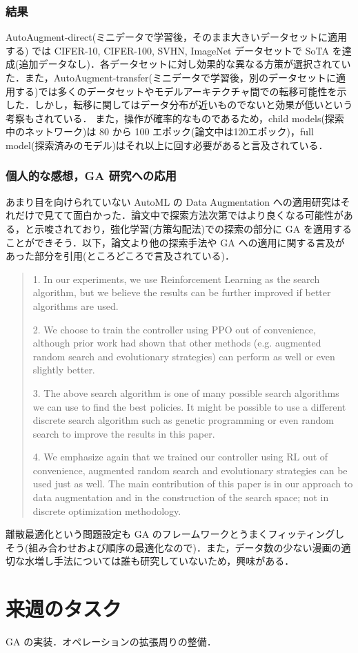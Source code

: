 \documentclass[onecolumn]{ujarticle}   %
\begin{document}
	\subsubsection{結果}
	AutoAugment-direct(ミニデータで学習後，そのまま大きいデータセットに適用する) では CIFER-10, CIFER-100, SVHN, ImageNet データセットで SoTA を達成(追加データなし)．各データセットに対し効果的な異なる方策が選択されていた．また，AutoAugment-transfer(ミニデータで学習後，別のデータセットに適用する)では多くのデータセットやモデルアーキテクチャ間での転移可能性を示した．しかし，転移に関してはデータ分布が近いものでないと効果が低いという考察もされている．
	また，操作が確率的なものであるため，child models(探索中のネットワーク)は 80 から 100 エポック(論文中は120エポック)，full model(探索済みのモデル)はそれ以上に回す必要があると言及されている．

	\subsubsection{個人的な感想，GA 研究への応用}
	あまり目を向けられていない AutoML の Data Augmentation への適用研究はそれだけで見てて面白かった．論文中で探索方法次第ではより良くなる可能性がある，と示唆されており，強化学習(方策勾配法)での探索の部分に GA を適用することができそう．以下，論文より他の探索手法や GA への適用に関する言及があった部分を引用(ところどころで言及されている)．

	\begin{quote}
		1. In our experiments, we use Reinforcement Learning as the search algorithm, but we believe the results can be further improved if better algorithms are used.

		2. We choose to train the controller using PPO out of convenience, although prior work had shown that other methods (e.g. augmented random search and evolutionary strategies) can perform as well or even slightly better.

		3. The above search algorithm is one of many possible search algorithms we can use to find the best policies. It might be possible to use a different discrete search algorithm such as genetic programming or even random search to improve the results in this paper.

		4. We emphasize again that we trained our controller using RL out of convenience, augmented random search and evolutionary strategies can be used just as well. The main contribution of this paper is in our approach to data augmentation and in the construction of the search space; not in discrete optimization methodology.
	\end{quote}

	離散最適化という問題設定も GA のフレームワークとうまくフィッティングしそう(組み合わせおよび順序の最適化なので)．また，データ数の少ない漫画の適切な水増し手法については誰も研究していないため，興味がある．

	\section{来週のタスク}
	GA の実装．オペレーションの拡張周りの整備．

	
	
\end{document}
